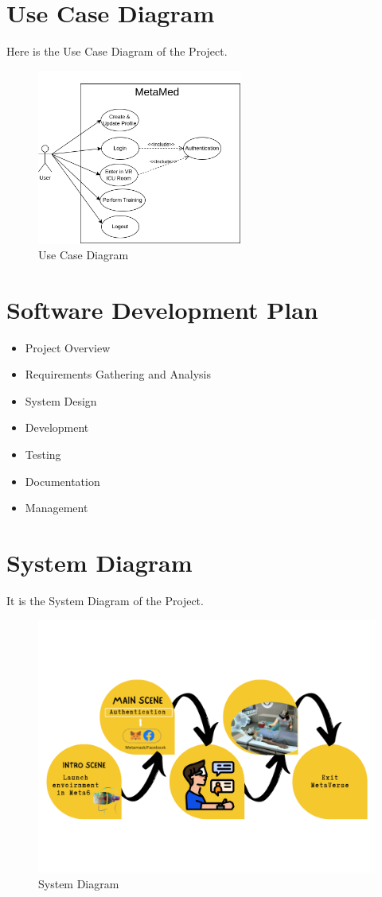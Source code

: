 \section{Use Case Diagram}
Here is the Use Case Diagram of the Project.
\begin{figure}[h]
    \centering
    \includegraphics[width=0.6\textwidth, height=0.3\textheight]{Images/Use Case.drawio.png}
    \caption{Use Case Diagram}
    \label{fig:system-diagram}
\end{figure}

\section{Software Development Plan}
\begin{itemize}
    \item Project Overview 
    \item Requirements Gathering and Analysis
    \item System Design
    \item Development
    \item Testing
    \item Documentation
    \item Management
\end{itemize}

\section{System Diagram}
It is the System Diagram of the Project.
\begin{figure}[h]
    \centering
    \includegraphics[width=1\linewidth, height=0.65\linewidth]{Images/system.png}
    \caption{System Diagram}
\end{figure}
\newpage
